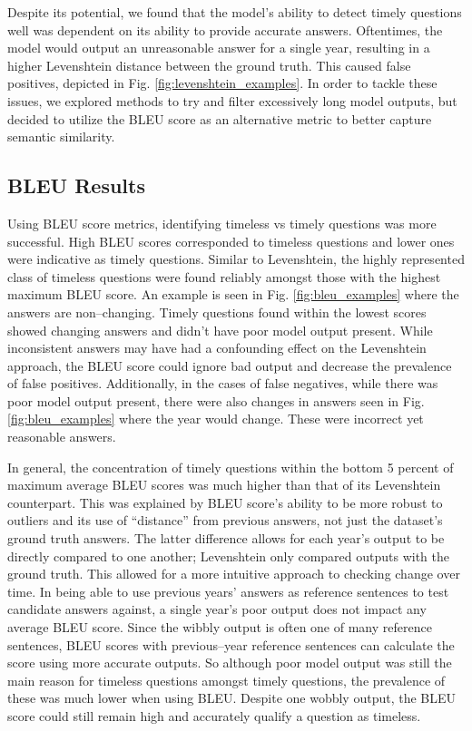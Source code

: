 \documentclass{article}
\begin{document}
Despite its potential, we found that the model’s ability to detect timely
questions well was dependent on its ability to provide accurate answers.
Oftentimes, the model would output an unreasonable answer for a single year,
resulting in a higher Levenshtein distance between the ground truth. This caused
false positives, depicted in Fig. \ref{fig:levenshtein_examples}. In order to
tackle these issues, we explored methods to try and filter excessively long
model outputs, but decided to utilize the BLEU score as an alternative metric to
better capture semantic similarity.




\subsection{BLEU Results}
\label{bleu results}


Using BLEU score metrics, identifying timeless vs timely questions was more
successful. High BLEU scores corresponded to timeless questions and lower ones
were indicative as timely questions. Similar to Levenshtein, the highly
represented class of timeless questions were found reliably amongst those with
the highest maximum BLEU score. An example is seen in Fig.
\ref{fig:bleu_examples} where the answers are non--changing. Timely questions
found within the lowest scores showed changing answers and didn't have poor
model output present. While inconsistent answers may have had a confounding
effect on the Levenshtein approach, the BLEU score could ignore bad output and
decrease the prevalence of false positives. Additionally, in the cases of false
negatives, while there was poor model output present, there were also changes in
answers seen in Fig. \ref{fig:bleu_examples} where the year would change. These
were incorrect yet reasonable answers.

In general, the concentration of timely questions within the bottom 5 percent of
maximum average BLEU scores was much higher than that of its Levenshtein
counterpart. This was explained by BLEU score’s ability to be more robust to
outliers and its use of “distance” from previous answers, not just the dataset’s
ground truth answers. The latter difference allows for each year’s output to be
directly compared to one another; Levenshtein only compared outputs with the
ground truth. This allowed for a more intuitive approach to checking change over
time. In being able to use previous years’ answers as reference sentences to
test candidate answers against, a single year’s poor output does not impact any
average BLEU score. Since the wibbly output is often one of many reference
sentences, BLEU scores with previous--year reference sentences can calculate the
score using more accurate outputs. So although poor model output was still the
main reason for timeless questions amongst timely questions, the prevalence of
these was much lower when using BLEU. Despite one wobbly output, the BLEU score
could still remain high and accurately qualify a question as timeless.
\end{document}
